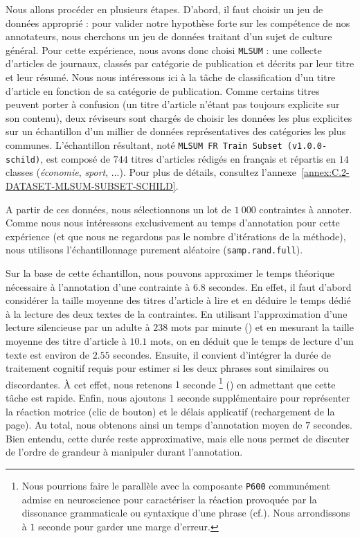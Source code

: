 			Nous allons procéder en plusieurs étapes.
			D'abord, il faut choisir un jeu de données approprié : pour valider notre hypothèse forte sur les compétence de nos annotateurs, nous cherchons un jeu de données traitant d'un sujet de culture général.
			Pour cette expérience, nous avons donc choisi \texttt{MLSUM} : une collecte d'articles de journaux, classés par catégorie de publication et décrits par leur titre et leur résumé.
			Nous nous intéressons ici à la tâche de classification d'un titre d'article en fonction de sa catégorie de publication.
			Comme certains titres peuvent porter à confusion (un titre d'article n'étant pas toujours explicite sur son contenu), deux réviseurs sont chargés de choisir les données les plus explicites sur un échantillon d'un millier de données représentatives des catégories les plus communes.
			L'échantillon résultant, noté \texttt{MLSUM FR Train Subset (v1.0.0-schild)}, est composé de $744$ titres d'articles rédigés en français et répartis en $14$ classes (\textit{économie}, \textit{sport}, ...).
			Pour plus de détails, consultez l'annexe~\ref{annex:C.2-DATASET-MLSUM-SUBSET-SCHILD}.
			
			A partir de ces données, nous sélectionnons un lot de $1~000$ contraintes à annoter.
			Comme nous nous intéressons exclusivement au temps d'annotation pour cette expérience (et que nous ne regardons pas le nombre d'itérations de la méthode), nous utilisons l'échantillonnage purement aléatoire (\texttt{samp.rand.full}).
			
			Sur la base de cette échantillon, nous pouvons approximer le temps théorique nécessaire à l'annotation d'une contrainte à $6.8$ secondes.
			En effet, il faut d'abord considérer la taille moyenne des titres d'article à lire et en déduire le temps dédié à la lecture des deux textes de la contraintes.
			En utilisant l'approximation d'une lecture silencieuse par un adulte à $238$ mots par minute (\cite{brysbaert:2019:how-many-words}) et en mesurant la taille moyenne des titre d'article à $10.1$ mots, on en déduit que le temps de lecture d'un texte est environ de $2.55$ secondes.
			Ensuite, il convient d'intégrer la durée de traitement cognitif requis pour estimer si les deux phrases sont similaires ou discordantes.
			À cet effet, nous retenons $1$ seconde
			\footnote{Nous pourrions faire le parallèle avec la composante \texttt{P600} communément admise en neuroscience pour caractériser la réaction provoquée par la dissonance grammaticale ou syntaxique d'une phrase (cf.). Nous arrondissons à $1$ seconde pour garder une marge d'erreur.
			} (\cite{purves-brannon:2013:principles-cognitive-neuroscience})
			en admettant que cette tâche est rapide.
			Enfin, nous ajoutons $1$ seconde supplémentaire pour représenter la réaction motrice (clic de bouton) et le délais applicatif (rechargement de la page).
			Au total, nous obtenons ainsi un temps d'annotation moyen de $7$ secondes.
			Bien entendu, cette durée reste approximative, mais elle nous permet de discuter de l'ordre de grandeur à manipuler durant l'annotation.
			
